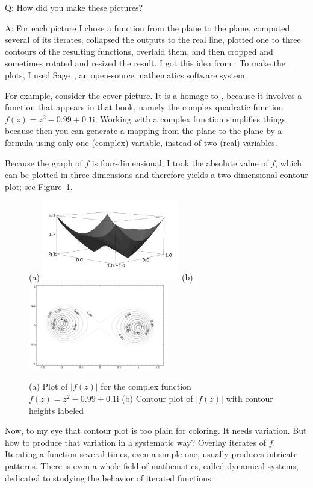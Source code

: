 \documentclass[12pt, a4paper]{amsart}
\newcommand{\mi}{\text{i}}  %
\begin{document}
Q: How did you make these pictures?

A: For each picture I chose a function from the plane to the plane, computed several of its iterates, collapsed the outputs to the real line, plotted one to three contours of the resulting functions, overlaid them, and then cropped and sometimes rotated and resized the result.
I got this idea from \cite{Hamp2009}.
To make the plots, I used Sage~\cite{Sage}, an open-source mathematics software system.

For example, consider the cover picture.
It is a homage to \cite{Hamp2009}, because it involves a function that appears in that book, namely the complex quadratic function $f(z) = z^2  - 0.99 + 0.1\mi$.
Working with a complex function simplifies things, because then you can  generate a mapping from the plane to the plane by a formula using only one (complex) variable, instead of two (real) variables.

Because the graph of $f$ is four-dimensional, I took the absolute value of $f$, which can be plotted in three dimensions and therefore yields a two-dimensional contour plot; see Figure~\ref{fig:3d}.

\begin{figure}[!ht]
(a) \includegraphics[width=60mm]{images/tutorial_3d.png}\qquad
(b) \includegraphics[width=60mm]{images/tutorial_contour.pdf}
\caption{
(a) Plot of $|f(z)|$ for the complex function $f(z) = z^2  - 0.99 + 0.1\mi$
(b) Contour plot of $|f(z)|$ with contour heights labeled
}
\label{fig:3d}
\end{figure}

Now, to my eye that contour plot is too plain for coloring.
It needs variation.
But how to produce that variation in a systematic way?
Overlay iterates of $f$. 
Iterating a function several times, even a simple one, usually produces intricate patterns.
There is even a whole field of mathematics, called dynamical systems, dedicated to studying the behavior of iterated functions.
\end{document}
